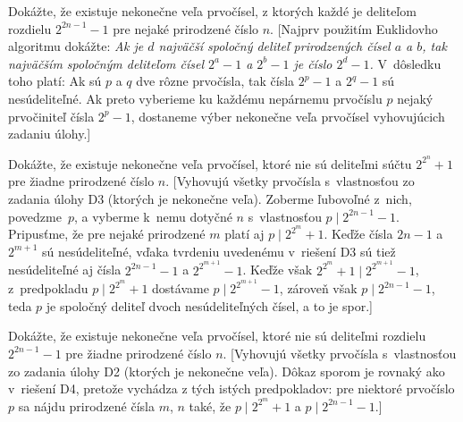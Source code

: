 {Dokážte, že existuje nekonečne veľa prvočísel, z ktorých každé
je deliteľom rozdielu $2^{2n-1} - 1$ pre nejaké prirodzené číslo $n$.
[Najprv použitím Euklidovho algoritmu dokážte:
{\sl Ak je $d$ najväčší spoločný deliteľ prirodzených čísel $a$
a $b$, tak najväčším spoločným deliteľom čísel $2^a-1$ a $2^b-1$
je číslo $2^d-1$.} V~dôsledku toho platí: Ak sú $p$ a $q$ dve
rôzne prvočísla, tak čísla $2^p-1$ a $2^q-1$ sú nesúdeliteľné.
Ak preto vyberieme ku každému nepárnemu prvočíslu $p$ nejaký
prvočiniteľ čísla $2^p-1$, dostaneme výber nekonečne veľa prvočísel
vyhovujúcich zadaniu úlohy.]

Dokážte, že existuje nekonečne veľa prvočísel, ktoré nie sú
deliteľmi súčtu $2^{2^n} + 1$ pre žiadne prirodzené číslo $n$.
[Vyhovujú všetky prvočísla s~vlastnosťou zo zadania úlohy D3
(ktorých je nekonečne veľa). Zoberme ľubovoľné z~nich, povedzme~$p$,
a vyberme k~nemu dotyčné
$n$ s~vlastnosťou $p\mid 2^{2n-1} - 1$. Pripusťme, že pre nejaké
prirodzené $m$ platí aj $p\mid 2^{2^m} + 1$. Keďže čísla
$2n-1$ a $2^{m+1}$ sú nesúdeliteľné, vďaka tvrdeniu uvedenému v~riešení
D3 sú tiež nesúdeliteľné aj čísla $2^{2n-1} - 1$ a $2^{2^{m+1}}-1$.
Keďže však $2^{2^m} + 1\mid 2^{2^{m+1}}-1$, z~predpokladu
$p\mid 2^{2^m} + 1$ dostávame $p\mid 2^{2^{m+1}}-1$, zároveň však
$p\mid 2^{2n-1} - 1$, teda $p$ je spoločný deliteľ dvoch
nesúdeliteľných čísel, a to je spor.]

Dokážte, že existuje nekonečne veľa prvočísel, ktoré nie sú
deliteľmi rozdielu $2^{2n-1} - 1$ pre žiadne prirodzené číslo $n$.
[Vyhovujú všetky prvočísla s~vlastnosťou zo zadania úlohy D2
(ktorých je nekonečne veľa). Dôkaz sporom je rovnaký ako
v~riešení D4, pretože vychádza z tých istých predpokladov: pre niektoré
prvočíslo $p$ sa nájdu prirodzené čísla $m$, $n$ také, že
$p\mid 2^{2^m} + 1$ a $p\mid 2^{2n-1} - 1$.]

}

